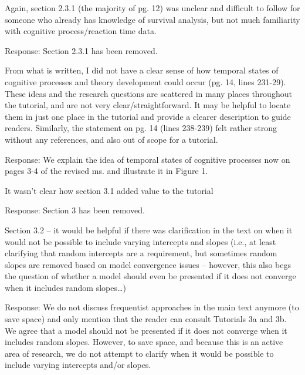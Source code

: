 \documentclass[
]{article}
\renewenvironment{quote}{\begin{leftbar}}{\end{leftbar}}
\begin{document}
\begin{quote}
Again, section 2.3.1 (the majority of pg. 12) was unclear and difficult
to follow for someone who already has knowledge of survival analysis,
but not much familiarity with cognitive process/reaction time data.
\end{quote}

Response: Section 2.3.1 has been removed.

\begin{quote}
From what is written, I did not have a clear sense of how temporal
states of cognitive processes and theory development could occur (pg.
14, lines 231-29). These ideas and the research questions are scattered
in many places throughout the tutorial, and are not very
clear/straightforward. It may be helpful to locate them in just one
place in the tutorial and provide a clearer description to guide
readers. Similarly, the statement on pg. 14 (lines 238-239) felt rather
strong without any references, and also out of scope for a tutorial.
\end{quote}

Response: We explain the idea of temporal states of cognitive processes
now on pages 3-4 of the revised ms. and illustrate it in Figure 1.

\begin{quote}
It wasn't clear how section 3.1 added value to the tutorial
\end{quote}

Response: Section 3 has been removed.

\begin{quote}
Section 3.2 -- it would be helpful if there was clarification in the
text on when it would not be possible to include varying intercepts and
slopes (i.e., at least clarifying that random intercepts are a
requirement, but sometimes random slopes are removed based on model
convergence issues -- however, this also begs the question of whether a
model should even be presented if it does not converge when it includes
random slopes\ldots)
\end{quote}

Response: We do not discuss frequentist approaches in the main text
anymore (to save space) and only mention that the reader can consult
Tutorials 3a and 3b. We agree that a model should not be presented if it
does not converge when it includes random slopes. However, to save
space, and because this is an active area of research, we do not attempt
to clarify when it would be possible to include varying intercepts
and/or slopes.
\end{document}
